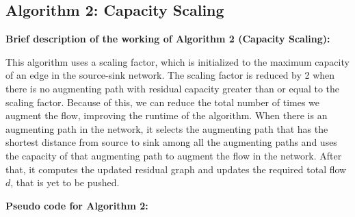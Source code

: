 \documentclass{article}
\begin{document}
\subsection{Algorithm 2: Capacity Scaling}

\textbf{Brief description of the working of Algorithm 2 (Capacity Scaling):}

This algorithm uses a scaling factor, which is initialized to the maximum capacity of an edge in the source-sink network. The scaling factor is reduced by 2 when there is no augmenting path with residual capacity greater than or equal to the scaling factor. Because of this, we can reduce the total number of times we augment the flow, improving the runtime of the algorithm. When there is an augmenting path in the network, it selects the augmenting path that has the shortest distance from source to sink among all the augmenting paths and uses the capacity of that augmenting path to augment the flow in the network. After that, it computes the updated residual graph and updates the required total flow \(d\), that is yet to be pushed.

\textbf{Pseudo code for Algorithm 2:}
\end{document}
